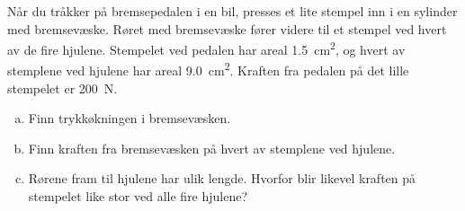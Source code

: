 %
Når du tråkker på bremsepedalen i en bil, presses et lite stempel inn i en sylinder med bremsevæske. Røret med bremsevæske fører videre til et stempel ved hvert av de fire hjulene. Stempelet ved pedalen har areal \SI{1.5}{\centi\metre\squared}, og hvert av stemplene ved hjulene har areal \SI{9.0}{\centi\metre\squared}. Kraften fra pedalen på det lille stempelet er \SI{200}{\newton}.
\begin{enumerate}[a)]
    \item Finn trykkøkningen i bremsevæsken.
    \item Finn kraften fra bremsevæsken på hvert av stemplene ved hjulene.
    \item Rørene fram til hjulene har ulik lengde. Hvorfor blir likevel kraften på stempelet like stor ved alle fire hjulene?
\end{enumerate}
%
